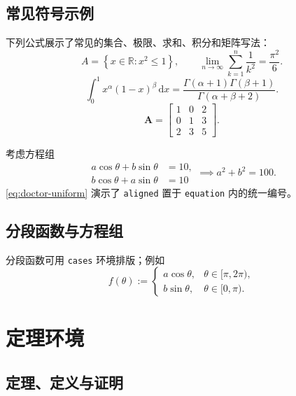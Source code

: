 \section{常见符号示例}
下列公式展示了常见的集合、极限、求和、积分和矩阵写法：
\begin{equation}
  A=\left\{x\in\mathbb{R}: x^2\le 1\right\}, \qquad
  \lim_{n\to\infty}\sum_{k=1}^{n}\frac{1}{k^2}=\frac{\pi^2}{6}.
\end{equation}
\begin{equation}
  \int_{0}^{1} x^\alpha (1-x)^\beta\,\mathrm{d}x
  = \frac{\Gamma(\alpha+1)\Gamma(\beta+1)}{\Gamma(\alpha+\beta+2)}.
\end{equation}
\begin{equation}
  \mathbf{A}=
  \begin{bmatrix}
    1 & 0 & 2 \\
    0 & 1 & 3 \\
    2 & 3 & 5
  \end{bmatrix}.
\end{equation}

考虑方程组
\begin{equation}\label{eq:doctor-uniform}
\begin{aligned}
  a\cos\theta+b\sin\theta&=10,\\
  b\cos\theta+a\sin\theta&=10
\end{aligned}
  \implies a^2+b^2=100.
\end{equation}
\eqref{eq:doctor-uniform} 演示了 \texttt{aligned} 置于 \texttt{equation} 内的统一编号。

\section{分段函数与方程组}
分段函数可用 \texttt{cases} 环境排版；例如
\[
  f(\theta):=
  \begin{cases}
    a\cos\theta,&\theta\in[\pi,2\pi),\\
    b\sin\theta,&\theta\in[0,\pi).
  \end{cases}
\]

\chapter{定理环境}\label{ch:doctor-theorem}

\section{定理、定义与证明}

